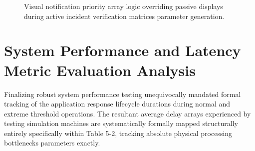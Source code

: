 \begin{figure}[h]
    \centering
    \caption{Visual notification priority array logic overriding passive displays during active incident verification matrices parameter generation.}
    \label{fig:toast_visualizing}
\end{figure}

\section{System Performance and Latency Metric Evaluation Analysis}
Finalizing robust system performance testing unequivocally mandated formal tracking of the application response lifecycle durations during normal and extreme threshold operations. The resultant average delay arrays experienced by testing simulation machines are systematically formally mapped structurally entirely specifically within Table 5-2, tracking absolute physical processing bottlenecks parameters exactly.

